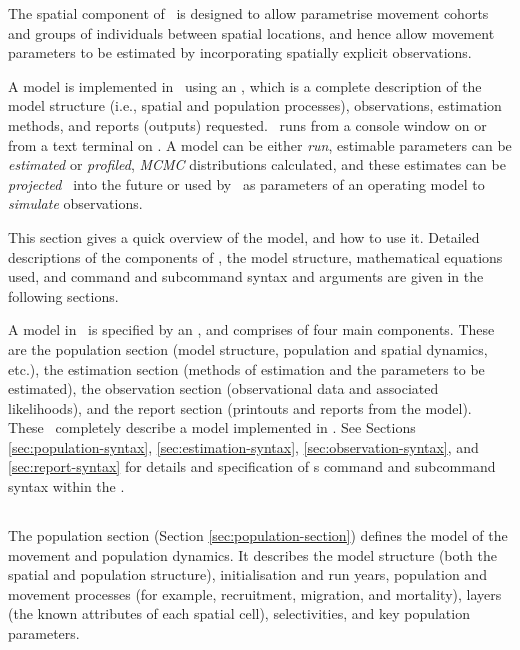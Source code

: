 The spatial component of \SPM\ is designed to allow parametrise movement cohorts and groups of individuals between spatial locations, and hence allow movement parameters to be estimated by incorporating spatially explicit observations. 

A model is implemented in \SPM\ using an \config {}, which is a complete description of the model structure (i.e., spatial and population processes), observations, estimation methods, and reports (outputs) requested. \SPM\ runs from a console window on  or from a text terminal on . A model can be either \emph{run}, estimable parameters can be \emph{estimated} or \emph{profiled}, \emph{MCMC} distributions calculated, and these estimates can be \emph{projected} \NYI\ into the future or used by \SPM\ as parameters of an operating model to \emph{simulate} observations.

This section gives a quick overview of the model, and how to use it. Detailed descriptions of the components of \SPM, the model structure, mathematical equations used, and command and subcommand syntax and arguments are given in the following sections.

A model in \SPM\ is specified by an \config, and comprises of four main components. These are the population section (model structure, population and spatial dynamics, etc.), the estimation section (methods of estimation and the parameters to be estimated), the observation section (observational data and associated likelihoods), and the report section (printouts and reports from the model). These \config\ completely describe a model implemented in \SPM. See Sections \ref{sec:population-syntax}, \ref{sec:estimation-syntax}, \ref{sec:observation-syntax}, and \ref{sec:report-syntax} for details and specification of \SPM s command and subcommand syntax within the \config. 

\subsection{}

The population section (Section \ref{sec:population-section}) defines the model of the movement and population dynamics. It describes the model structure (both the spatial and population structure), initialisation and run years, population and movement processes (for example, recruitment, migration, and mortality), layers (the known attributes of each spatial cell), selectivities, and key population parameters.

